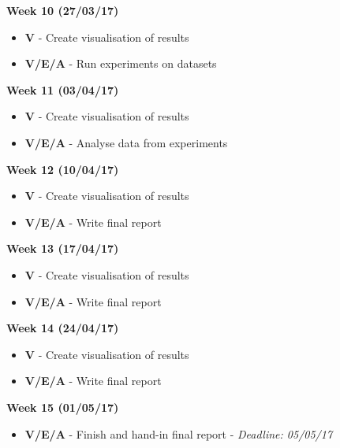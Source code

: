 \documentclass[12pt]{report}
\begin{document}
\textbf{Week 10 (27/03/17)}
\begin{itemize}
\item \textbf{V} - Create visualisation of results
\item \textbf{V/E/A} - Run experiments on datasets
\end{itemize}

\textbf{Week 11 (03/04/17)}
\begin{itemize}
\item \textbf{V} - Create visualisation of results
\item \textbf{V/E/A} - Analyse data from experiments
\end{itemize}

\textbf{Week 12 (10/04/17)}
\begin{itemize}
\item \textbf{V} - Create visualisation of results
\item \textbf{V/E/A} - Write final report
\end{itemize}

\textbf{Week 13 (17/04/17)}
\begin{itemize}
\item \textbf{V} - Create visualisation of results
\item \textbf{V/E/A} - Write final report
\end{itemize}

\textbf{Week 14 (24/04/17)}
\begin{itemize}
\item \textbf{V} - Create visualisation of results
\item \textbf{V/E/A} - Write final report
\end{itemize}

\textbf{Week 15 (01/05/17)}
\begin{itemize}
\item \textbf{V/E/A} - Finish and hand-in final report - \textit{Deadline: 05/05/17}
\end{itemize}

\clearpage
\renewcommand{\bibsection}{\section*{References}}
{}

\end{document}
